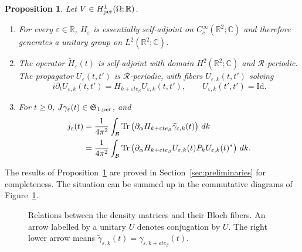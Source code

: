 \documentclass[a4paper,11pt]{article}
\newcommand{\Schatten}{{\mathfrak S}}
\theoremstyle{plain}
\newtheorem{proposition}[theorem]{Proposition}
\theoremstyle{remark}
\def\R{{\mathbb R}}
\def\C{{\mathbb C}}
\def\eps{{\varepsilon}}
\def\cB{{\mathcal B}}
\def\cR{{\mathcal R}}
\begin{document}
\begin{proposition}\label{prop:setting}
Let $V\in H^1_{\rm per}(\Omega;\R)$.
\begin{enumerate}
\item For every $\eps\in\R$, $H_\eps$ is essentially self-adjoint on
$C_c^\infty(\R^2;\C)$ and therefore generates a unitary group on $L^2(\R^2;\C)$.
\item The operator $\widetilde H_\eps(t)$ is self-adjoint with domain
$H^2(\R^2;\C)$ and $\cR$-periodic. The propagator $U_\eps(t,t')$ is
$\cR$-periodic, with fibers $U_{\eps,k}(t,t')$ solving
\begin{equation}\label{eq:propagator2}
i\partial_tU_{\eps,k}(t,t')=H_{k+\eps te_\beta}U_{\eps,k}(t,t'),
\qquad U_{\eps,k}(t',t')=\mathrm{Id}.
\end{equation}
\item For $t\ge0$, $J\gamma_\eps(t)\in\Schatten_{1,\rm per}$, and
\begin{align}\label{eq:current-k}
j_\eps(t)&=\frac1{4\pi^2}\int_\cB
\Tr\left(\partial_\alpha H_{k+\eps te_\beta}\widetilde\gamma_{\eps,k}(t)\right)\,dk\\
&=\frac1{4\pi^2}\int_\cB\Tr\left(\partial_\alpha H_{k+\eps te_\beta}
U_{\eps,k}(t)P_kU_{\eps,k}(t)^*\right)\,dk.\nonumber
\end{align}
\end{enumerate}
\end{proposition}
The results of Proposition~\ref{prop:setting} are proved in
Section~\ref{sec:preliminaries} for completeness. The situation can be
summed up in the commutative diagrams of Figure~\ref{fig:diagram}.
\begin{figure}[h!]
\centering
{}
\medskip

\caption{Relations between the density matrices and their Bloch fibers.
An arrow labelled by a unitary $U$ denotes conjugation by $U$.
The right lower arrow means
$\widetilde\gamma_{\eps,k}(t)=\gamma_{\eps,k+\eps te_\beta}(t)$.}
\label{fig:diagram}
\end{figure}
\end{document}
